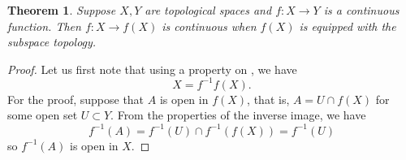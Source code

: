 \documentclass[12pt]{article}
\newtheorem{thm}{Theorem}
\begin{document}
\begin{thm}
Suppose $X,Y$ are topological spaces and $f\colon X\to Y$ is a
continuous function. Then 
$f\colon X\to f(X)$ is continuous when $f(X)$ is equipped with
the subspace topology.
\end{thm}

\begin{proof} Let us first note that using a 
propert{y} on , we have
$$
  X = f^{-1} f(X).
$$
For the proof, suppose that $A$ is ope{n} 
  in $f(X)$, that is, $A=U\cap f(X)$
  for some open set $U\subset Y$. From the properties of 
  the inverse image, we have
$$
  f^{-1}(A) = f^{-1}(U) \cap f^{-1}(f(X))= f^{-1}(U)
$$
so $f^{-1}(A)$ is open in $X$. 
\end{proof}
\end{document}
